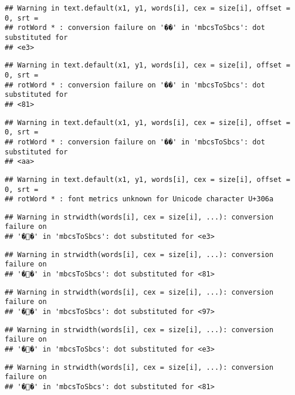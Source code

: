 \documentclass[]{article}
\begin{document}
\begin{verbatim}
## Warning in text.default(x1, y1, words[i], cex = size[i], offset = 0, srt =
## rotWord * : conversion failure on '��' in 'mbcsToSbcs': dot substituted for
## <e3>
\end{verbatim}

\begin{verbatim}
## Warning in text.default(x1, y1, words[i], cex = size[i], offset = 0, srt =
## rotWord * : conversion failure on '��' in 'mbcsToSbcs': dot substituted for
## <81>
\end{verbatim}

\begin{verbatim}
## Warning in text.default(x1, y1, words[i], cex = size[i], offset = 0, srt =
## rotWord * : conversion failure on '��' in 'mbcsToSbcs': dot substituted for
## <aa>
\end{verbatim}

\begin{verbatim}
## Warning in text.default(x1, y1, words[i], cex = size[i], offset = 0, srt =
## rotWord * : font metrics unknown for Unicode character U+306a
\end{verbatim}

\begin{verbatim}
## Warning in strwidth(words[i], cex = size[i], ...): conversion failure on
## '��' in 'mbcsToSbcs': dot substituted for <e3>
\end{verbatim}

\begin{verbatim}
## Warning in strwidth(words[i], cex = size[i], ...): conversion failure on
## '��' in 'mbcsToSbcs': dot substituted for <81>
\end{verbatim}

\begin{verbatim}
## Warning in strwidth(words[i], cex = size[i], ...): conversion failure on
## '��' in 'mbcsToSbcs': dot substituted for <97>
\end{verbatim}

\begin{verbatim}
## Warning in strwidth(words[i], cex = size[i], ...): conversion failure on
## '��' in 'mbcsToSbcs': dot substituted for <e3>
\end{verbatim}

\begin{verbatim}
## Warning in strwidth(words[i], cex = size[i], ...): conversion failure on
## '��' in 'mbcsToSbcs': dot substituted for <81>
\end{verbatim}
\end{document}
